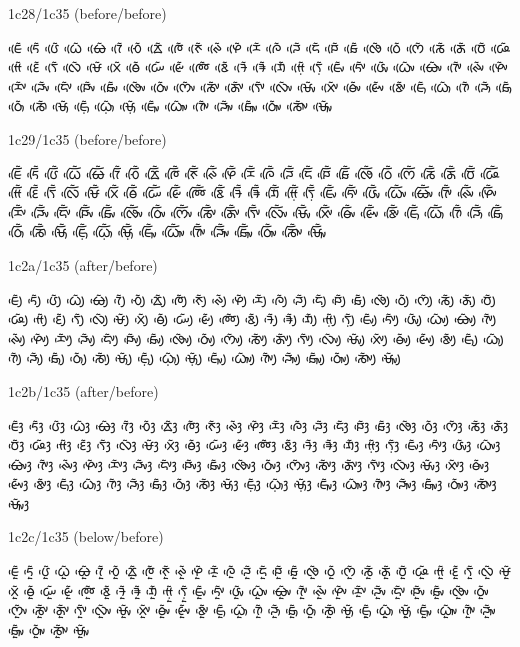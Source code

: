 \noindent
1c28/1c35 (before/before)

\noindent
ᰀᰨᰵᰶ ᰁᰨᰵᰶ ᰂᰨᰵᰶ ᰃᰨᰵᰶ ᰄᰨᰵᰶ ᰅᰨᰵᰶ ᰆᰨᰵᰶ ᰇᰨᰵᰶ ᰈᰨᰵᰶ ᰉᰨᰵᰶ ᰊᰨᰵᰶ ᰋᰨᰵᰶ ᰌᰨᰵᰶ ᰍᰨᰵᰶ ᰎᰨᰵᰶ ᰏᰨᰵᰶ ᰐᰨᰵᰶ ᰑᰨᰵᰶ ᰒᰨᰵᰶ ᰓᰨᰵᰶ ᰔᰨᰵᰶ ᰕᰨᰵᰶ ᰖᰨᰵᰶ ᰗᰨᰵᰶ ᰘᰨᰵᰶ ᰙᰨᰵᰶ ᰚᰨᰵᰶ ᰛᰨᰵᰶ ᰜᰨᰵᰶ ᰝᰨᰵᰶ ᰞᰨᰵᰶ ᰟᰨᰵᰶ ᰠᰨᰵᰶ ᰡᰨᰵᰶ ᰢᰨᰵᰶ ᰣᰨᰵᰶ ᱍᰨᰵᰶ ᱎᰨᰵᰶ ᱏᰨᰵᰶ ᰙ᰷ᰨᰵᰶ ᰛ᰷ᰨᰵᰶ ᰀᰤᰨᰵᰶ ᰁᰤᰨᰵᰶ ᰂᰤᰨᰵᰶ ᰃᰤᰨᰵᰶ ᰄᰤᰨᰵᰶ ᰅᰤᰨᰵᰶ ᰊᰤᰨᰵᰶ ᰋᰤᰨᰵᰶ ᰌᰤᰨᰵᰶ ᰎᰤᰨᰵᰶ ᰏᰤᰨᰵᰶ ᰐᰤᰨᰵᰶ ᰑᰤᰨᰵᰶ ᰒᰤᰨᰵᰶ ᰓᰤᰨᰵᰶ ᰔᰤᰨᰵᰶ ᰕᰤᰨᰵᰶ ᰖᰤᰨᰵᰶ ᰛᰤᰨᰵᰶ ᰜᰤᰨᰵᰶ ᰝᰤᰨᰵᰶ ᰞᰤᰨᰵᰶ ᰟᰤᰨᰵᰶ ᰡᰤᰨᰵᰶ ᰣᰤᰨᰵᰶ ᰀᰥᰨᰵᰶ ᰃᰥᰨᰵᰶ ᰅᰥᰨᰵᰶ ᰎᰥᰨᰵᰶ ᰑᰥᰨᰵᰶ ᰓᰥᰨᰵᰶ ᰕᰥᰨᰵᰶ ᰝᰥᰨᰵᰶ ᰀ᰷ᰥᰨᰵᰶ ᰃ᰷ᰥᰨᰵᰶ ᰝ᰷ᰥᰨᰵᰶ ᰀᰥᰤᰨᰵᰶ ᰃᰥᰤᰨᰵᰶ ᰅᰥᰤᰨᰵᰶ ᰎᰥᰤᰨᰵᰶ ᰑᰥᰤᰨᰵᰶ ᰓᰥᰤᰨᰵᰶ ᰕᰥᰤᰨᰵᰶ ᰝᰥᰤᰨᰵᰶ 

\noindent
1c29/1c35 (before/before)

\noindent
ᰀᰩᰵᰶ ᰁᰩᰵᰶ ᰂᰩᰵᰶ ᰃᰩᰵᰶ ᰄᰩᰵᰶ ᰅᰩᰵᰶ ᰆᰩᰵᰶ ᰇᰩᰵᰶ ᰈᰩᰵᰶ ᰉᰩᰵᰶ ᰊᰩᰵᰶ ᰋᰩᰵᰶ ᰌᰩᰵᰶ ᰍᰩᰵᰶ ᰎᰩᰵᰶ ᰏᰩᰵᰶ ᰐᰩᰵᰶ ᰑᰩᰵᰶ ᰒᰩᰵᰶ ᰓᰩᰵᰶ ᰔᰩᰵᰶ ᰕᰩᰵᰶ ᰖᰩᰵᰶ ᰗᰩᰵᰶ ᰘᰩᰵᰶ ᰙᰩᰵᰶ ᰚᰩᰵᰶ ᰛᰩᰵᰶ ᰜᰩᰵᰶ ᰝᰩᰵᰶ ᰞᰩᰵᰶ ᰟᰩᰵᰶ ᰠᰩᰵᰶ ᰡᰩᰵᰶ ᰢᰩᰵᰶ ᰣᰩᰵᰶ ᱍᰩᰵᰶ ᱎᰩᰵᰶ ᱏᰩᰵᰶ ᰙ᰷ᰩᰵᰶ ᰛ᰷ᰩᰵᰶ ᰀᰤᰩᰵᰶ ᰁᰤᰩᰵᰶ ᰂᰤᰩᰵᰶ ᰃᰤᰩᰵᰶ ᰄᰤᰩᰵᰶ ᰅᰤᰩᰵᰶ ᰊᰤᰩᰵᰶ ᰋᰤᰩᰵᰶ ᰌᰤᰩᰵᰶ ᰎᰤᰩᰵᰶ ᰏᰤᰩᰵᰶ ᰐᰤᰩᰵᰶ ᰑᰤᰩᰵᰶ ᰒᰤᰩᰵᰶ ᰓᰤᰩᰵᰶ ᰔᰤᰩᰵᰶ ᰕᰤᰩᰵᰶ ᰖᰤᰩᰵᰶ ᰛᰤᰩᰵᰶ ᰜᰤᰩᰵᰶ ᰝᰤᰩᰵᰶ ᰞᰤᰩᰵᰶ ᰟᰤᰩᰵᰶ ᰡᰤᰩᰵᰶ ᰣᰤᰩᰵᰶ ᰀᰥᰩᰵᰶ ᰃᰥᰩᰵᰶ ᰅᰥᰩᰵᰶ ᰎᰥᰩᰵᰶ ᰑᰥᰩᰵᰶ ᰓᰥᰩᰵᰶ ᰕᰥᰩᰵᰶ ᰝᰥᰩᰵᰶ ᰀ᰷ᰥᰩᰵᰶ ᰃ᰷ᰥᰩᰵᰶ ᰝ᰷ᰥᰩᰵᰶ ᰀᰥᰤᰩᰵᰶ ᰃᰥᰤᰩᰵᰶ ᰅᰥᰤᰩᰵᰶ ᰎᰥᰤᰩᰵᰶ ᰑᰥᰤᰩᰵᰶ ᰓᰥᰤᰩᰵᰶ ᰕᰥᰤᰩᰵᰶ ᰝᰥᰤᰩᰵᰶ 

\noindent
1c2a/1c35 (after/before)

\noindent
ᰀᰪᰵᰶ ᰁᰪᰵᰶ ᰂᰪᰵᰶ ᰃᰪᰵᰶ ᰄᰪᰵᰶ ᰅᰪᰵᰶ ᰆᰪᰵᰶ ᰇᰪᰵᰶ ᰈᰪᰵᰶ ᰉᰪᰵᰶ ᰊᰪᰵᰶ ᰋᰪᰵᰶ ᰌᰪᰵᰶ ᰍᰪᰵᰶ ᰎᰪᰵᰶ ᰏᰪᰵᰶ ᰐᰪᰵᰶ ᰑᰪᰵᰶ ᰒᰪᰵᰶ ᰓᰪᰵᰶ ᰔᰪᰵᰶ ᰕᰪᰵᰶ ᰖᰪᰵᰶ ᰗᰪᰵᰶ ᰘᰪᰵᰶ ᰙᰪᰵᰶ ᰚᰪᰵᰶ ᰛᰪᰵᰶ ᰜᰪᰵᰶ ᰝᰪᰵᰶ ᰞᰪᰵᰶ ᰟᰪᰵᰶ ᰠᰪᰵᰶ ᰡᰪᰵᰶ ᰢᰪᰵᰶ ᰣᰪᰵᰶ ᱍᰪᰵᰶ ᱎᰪᰵᰶ ᱏᰪᰵᰶ ᰙ᰷ᰪᰵᰶ ᰛ᰷ᰪᰵᰶ ᰀᰤᰪᰵᰶ ᰁᰤᰪᰵᰶ ᰂᰤᰪᰵᰶ ᰃᰤᰪᰵᰶ ᰄᰤᰪᰵᰶ ᰅᰤᰪᰵᰶ ᰊᰤᰪᰵᰶ ᰋᰤᰪᰵᰶ ᰌᰤᰪᰵᰶ ᰎᰤᰪᰵᰶ ᰏᰤᰪᰵᰶ ᰐᰤᰪᰵᰶ ᰑᰤᰪᰵᰶ ᰒᰤᰪᰵᰶ ᰓᰤᰪᰵᰶ ᰔᰤᰪᰵᰶ ᰕᰤᰪᰵᰶ ᰖᰤᰪᰵᰶ ᰛᰤᰪᰵᰶ ᰜᰤᰪᰵᰶ ᰝᰤᰪᰵᰶ ᰞᰤᰪᰵᰶ ᰟᰤᰪᰵᰶ ᰡᰤᰪᰵᰶ ᰣᰤᰪᰵᰶ ᰀᰥᰪᰵᰶ ᰃᰥᰪᰵᰶ ᰅᰥᰪᰵᰶ ᰎᰥᰪᰵᰶ ᰑᰥᰪᰵᰶ ᰓᰥᰪᰵᰶ ᰕᰥᰪᰵᰶ ᰝᰥᰪᰵᰶ ᰀ᰷ᰥᰪᰵᰶ ᰃ᰷ᰥᰪᰵᰶ ᰝ᰷ᰥᰪᰵᰶ ᰀᰥᰤᰪᰵᰶ ᰃᰥᰤᰪᰵᰶ ᰅᰥᰤᰪᰵᰶ ᰎᰥᰤᰪᰵᰶ ᰑᰥᰤᰪᰵᰶ ᰓᰥᰤᰪᰵᰶ ᰕᰥᰤᰪᰵᰶ ᰝᰥᰤᰪᰵᰶ 

\noindent
1c2b/1c35 (after/before)

\noindent
ᰀᰫᰵᰶ ᰁᰫᰵᰶ ᰂᰫᰵᰶ ᰃᰫᰵᰶ ᰄᰫᰵᰶ ᰅᰫᰵᰶ ᰆᰫᰵᰶ ᰇᰫᰵᰶ ᰈᰫᰵᰶ ᰉᰫᰵᰶ ᰊᰫᰵᰶ ᰋᰫᰵᰶ ᰌᰫᰵᰶ ᰍᰫᰵᰶ ᰎᰫᰵᰶ ᰏᰫᰵᰶ ᰐᰫᰵᰶ ᰑᰫᰵᰶ ᰒᰫᰵᰶ ᰓᰫᰵᰶ ᰔᰫᰵᰶ ᰕᰫᰵᰶ ᰖᰫᰵᰶ ᰗᰫᰵᰶ ᰘᰫᰵᰶ ᰙᰫᰵᰶ ᰚᰫᰵᰶ ᰛᰫᰵᰶ ᰜᰫᰵᰶ ᰝᰫᰵᰶ ᰞᰫᰵᰶ ᰟᰫᰵᰶ ᰠᰫᰵᰶ ᰡᰫᰵᰶ ᰢᰫᰵᰶ ᰣᰫᰵᰶ ᱍᰫᰵᰶ ᱎᰫᰵᰶ ᱏᰫᰵᰶ ᰙ᰷ᰫᰵᰶ ᰛ᰷ᰫᰵᰶ ᰀᰤᰫᰵᰶ ᰁᰤᰫᰵᰶ ᰂᰤᰫᰵᰶ ᰃᰤᰫᰵᰶ ᰄᰤᰫᰵᰶ ᰅᰤᰫᰵᰶ ᰊᰤᰫᰵᰶ ᰋᰤᰫᰵᰶ ᰌᰤᰫᰵᰶ ᰎᰤᰫᰵᰶ ᰏᰤᰫᰵᰶ ᰐᰤᰫᰵᰶ ᰑᰤᰫᰵᰶ ᰒᰤᰫᰵᰶ ᰓᰤᰫᰵᰶ ᰔᰤᰫᰵᰶ ᰕᰤᰫᰵᰶ ᰖᰤᰫᰵᰶ ᰛᰤᰫᰵᰶ ᰜᰤᰫᰵᰶ ᰝᰤᰫᰵᰶ ᰞᰤᰫᰵᰶ ᰟᰤᰫᰵᰶ ᰡᰤᰫᰵᰶ ᰣᰤᰫᰵᰶ ᰀᰥᰫᰵᰶ ᰃᰥᰫᰵᰶ ᰅᰥᰫᰵᰶ ᰎᰥᰫᰵᰶ ᰑᰥᰫᰵᰶ ᰓᰥᰫᰵᰶ ᰕᰥᰫᰵᰶ ᰝᰥᰫᰵᰶ ᰀ᰷ᰥᰫᰵᰶ ᰃ᰷ᰥᰫᰵᰶ ᰝ᰷ᰥᰫᰵᰶ ᰀᰥᰤᰫᰵᰶ ᰃᰥᰤᰫᰵᰶ ᰅᰥᰤᰫᰵᰶ ᰎᰥᰤᰫᰵᰶ ᰑᰥᰤᰫᰵᰶ ᰓᰥᰤᰫᰵᰶ ᰕᰥᰤᰫᰵᰶ ᰝᰥᰤᰫᰵᰶ 

\noindent
1c2c/1c35 (below/before)

\noindent
ᰀᰬᰵᰶ ᰁᰬᰵᰶ ᰂᰬᰵᰶ ᰃᰬᰵᰶ ᰄᰬᰵᰶ ᰅᰬᰵᰶ ᰆᰬᰵᰶ ᰇᰬᰵᰶ ᰈᰬᰵᰶ ᰉᰬᰵᰶ ᰊᰬᰵᰶ ᰋᰬᰵᰶ ᰌᰬᰵᰶ ᰍᰬᰵᰶ ᰎᰬᰵᰶ ᰏᰬᰵᰶ ᰐᰬᰵᰶ ᰑᰬᰵᰶ ᰒᰬᰵᰶ ᰓᰬᰵᰶ ᰔᰬᰵᰶ ᰕᰬᰵᰶ ᰖᰬᰵᰶ ᰗᰬᰵᰶ ᰘᰬᰵᰶ ᰙᰬᰵᰶ ᰚᰬᰵᰶ ᰛᰬᰵᰶ ᰜᰬᰵᰶ ᰝᰬᰵᰶ ᰞᰬᰵᰶ ᰟᰬᰵᰶ ᰠᰬᰵᰶ ᰡᰬᰵᰶ ᰢᰬᰵᰶ ᰣᰬᰵᰶ ᱍᰬᰵᰶ ᱎᰬᰵᰶ ᱏᰬᰵᰶ ᰙ᰷ᰬᰵᰶ ᰛ᰷ᰬᰵᰶ ᰀᰤᰬᰵᰶ ᰁᰤᰬᰵᰶ ᰂᰤᰬᰵᰶ ᰃᰤᰬᰵᰶ ᰄᰤᰬᰵᰶ ᰅᰤᰬᰵᰶ ᰊᰤᰬᰵᰶ ᰋᰤᰬᰵᰶ ᰌᰤᰬᰵᰶ ᰎᰤᰬᰵᰶ ᰏᰤᰬᰵᰶ ᰐᰤᰬᰵᰶ ᰑᰤᰬᰵᰶ ᰒᰤᰬᰵᰶ ᰓᰤᰬᰵᰶ ᰔᰤᰬᰵᰶ ᰕᰤᰬᰵᰶ ᰖᰤᰬᰵᰶ ᰛᰤᰬᰵᰶ ᰜᰤᰬᰵᰶ ᰝᰤᰬᰵᰶ ᰞᰤᰬᰵᰶ ᰟᰤᰬᰵᰶ ᰡᰤᰬᰵᰶ ᰣᰤᰬᰵᰶ ᰀᰥᰬᰵᰶ ᰃᰥᰬᰵᰶ ᰅᰥᰬᰵᰶ ᰎᰥᰬᰵᰶ ᰑᰥᰬᰵᰶ ᰓᰥᰬᰵᰶ ᰕᰥᰬᰵᰶ ᰝᰥᰬᰵᰶ ᰀ᰷ᰥᰬᰵᰶ ᰃ᰷ᰥᰬᰵᰶ ᰝ᰷ᰥᰬᰵᰶ ᰀᰥᰤᰬᰵᰶ ᰃᰥᰤᰬᰵᰶ ᰅᰥᰤᰬᰵᰶ ᰎᰥᰤᰬᰵᰶ ᰑᰥᰤᰬᰵᰶ ᰓᰥᰤᰬᰵᰶ ᰕᰥᰤᰬᰵᰶ ᰝᰥᰤᰬᰵᰶ 

